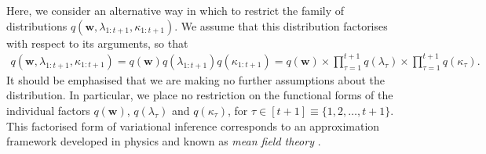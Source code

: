 Here, we consider an alternative way in which to restrict the family of distributions $q(\mathbf{w}, \lambda_{1:t+1}, \kappa_{1:t+1})$. We assume that this distribution factorises with respect to its arguments, so that
\begin{equation}
\label{eq:mfa-for-variational-pa-dist}
\begin{split}
	q(\mathbf{w}, \lambda_{1:t+1}, \kappa_{1:t+1})
	= q(\mathbf{w})q(\lambda_{1:t+1})q(\kappa_{1:t+1})
	= q(\mathbf{w})
	\times \prod_{\tau=1}^{t+1} q(\lambda_\tau)
	\times \prod_{\tau=1}^{t+1} q(\kappa_\tau).
\end{split}
\end{equation}
It should be emphasised that we are making no further assumptions about the distribution. In particular, we place no restriction on the functional forms of the individual factors $q(\mathbf{w})$, $q(\lambda_\tau)$ and $q(\kappa_\tau)$, for $\tau \in [t+1] \equiv \{1, 2, \ldots, t+1\}$. This factorised form of variational inference corresponds to an approximation framework developed in physics and known as \emph{mean field theory} \citep{parisi88}.

